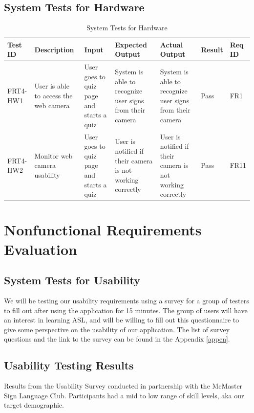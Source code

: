 \documentclass[12pt, titlepage]{article}
\begin{document}
\subsection{System Tests for Hardware}
\begin{longtable}{|p{1cm}|p{2.5cm}|p{2cm}|p{2cm}|p{2cm}|p{1.5cm}|p{1cm}|}
\caption{System Tests for Hardware} \\
\hline
\textbf{Test ID} & \textbf{Description} & \textbf{Input} & \textbf{Expected Output} & \textbf{Actual Output} & \textbf{Result} & \textbf{Req ID}\\
\hline
FRT4-HW1 & User is able to access the web camera & User goes to quiz page and starts a quiz & System is able to recognize user signs from their camera & System is able to recognize user signs from their camera & Pass & FR1 \\
\hline
FRT4-HW2 & Monitor web camera usability & User goes to quiz page and starts a quiz & User is notified if their camera is not working correctly & User is notified if their camera is not working correctly & Pass & FR11 \\
\bottomrule
\end{longtable}

\newpage
\section{Nonfunctional Requirements Evaluation}

\subsection{System Tests for Usability}

We will be testing our usability requirements using a survey for a group of testers to fill out after using the application for 15 minutes. The group of users will have an interest in learning ASL, and will be willing to fill out this questionnaire to give some perspective on the usability of our application. The list of survey questions and the link to the survey can be found in the Appendix \ref{appen}.

\subsection{Usability Testing Results}

Results from the Usability Survey conducted in partnership with the McMaster Sign Language Club. Participants had a mid to low range of skill levels, aka our target demographic.
\end{document}
